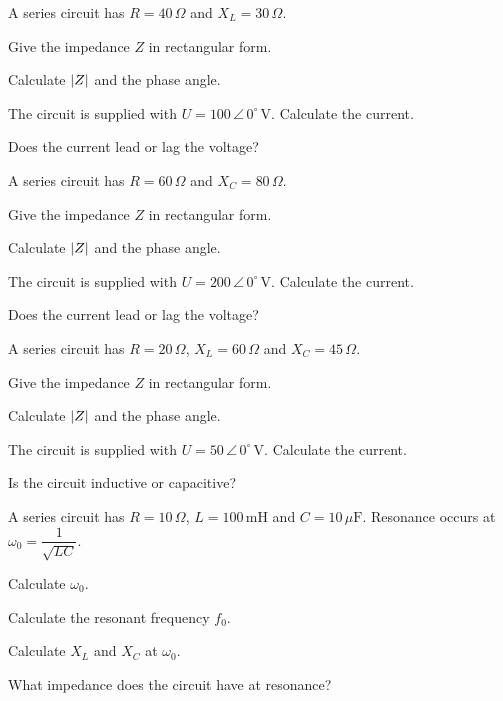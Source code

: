 A series circuit has $R = 40\,\Omega$ and $X_L = 30\,\Omega$.
\begin{parts}
  \item Give the impedance $Z$ in rectangular form.
  \item Calculate $\lvert Z\rvert$ and the phase angle.
  \item The circuit is supplied with $U = 100\,\angle\,0^{\circ}\,\text{V}$. Calculate the current.
  \item Does the current lead or lag the voltage?
\end{parts}

A series circuit has $R = 60\,\Omega$ and $X_C = 80\,\Omega$.
\begin{parts}
  \item Give the impedance $Z$ in rectangular form.
  \item Calculate $\lvert Z\rvert$ and the phase angle.
  \item The circuit is supplied with $U = 200\,\angle\,0^{\circ}\,\text{V}$. Calculate the current.
  \item Does the current lead or lag the voltage?
\end{parts}

A series circuit has $R = 20\,\Omega$, $X_L = 60\,\Omega$ and $X_C = 45\,\Omega$.
\begin{parts}
  \item Give the impedance $Z$ in rectangular form.
  \item Calculate $\lvert Z\rvert$ and the phase angle.
  \item The circuit is supplied with $U = 50\,\angle\,0^{\circ}\,\text{V}$. Calculate the current.
  \item Is the circuit inductive or capacitive?
\end{parts}

A series circuit has $R = 10\,\Omega$, $L = 100\,\text{mH}$ and $C = 10\,\mu\text{F}$. Resonance
occurs at $\omega_0 = \dfrac{1}{\sqrt{LC}}$.
\begin{parts}
  \item Calculate $\omega_0$.
  \item Calculate the resonant frequency $f_0$.
  \item Calculate $X_L$ and $X_C$ at $\omega_0$.
  \item What impedance does the circuit have at resonance?
\end{parts}

